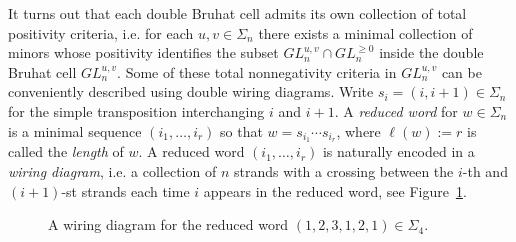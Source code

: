 \documentclass{amsart}
\theoremstyle{definition}
\theoremstyle{remark}
\numberwithin{equation}{section}
\begin{document}
    It turns out that each double Bruhat cell admits its own collection of total positivity criteria, i.e. for each $u,v\in\Sigma_n$ there exists a minimal collection of minors whose positivity identifies the subset $GL_n^{u,v}\cap GL_n^{\ge0}$ inside the double Bruhat cell $GL_n^{u,v}$.
    Some of these total nonnegativity criteria in $GL_n^{u,v}$ can be conveniently described using double wiring diagrams.  Write $s_i=(i,i+1)\in\Sigma_n$ for the simple transposition interchanging $i$ and $i+1$.  A \emph{reduced word} for $w\in\Sigma_n$ is a minimal sequence $(i_1,\ldots,i_r)$ so that $w=s_{i_1}\cdots s_{i_r}$, where $\ell(w):=r$ is called the \emph{length} of $w$.  A reduced word $(i_1,\ldots,i_r)$ is naturally encoded in a \emph{wiring diagram}, i.e. a collection of $n$ strands with a crossing between the $i$-th and $(i+1)$-st strands each time $i$ appears in the reduced word, see Figure~\ref{fig:wiring diagram}.
    \begin{figure}[ht]
    \caption{A wiring diagram for the reduced word $(1,2,3,1,2,1)\in\Sigma_4$.}
    \label{fig:wiring diagram}
    \end{figure}
\end{document}
